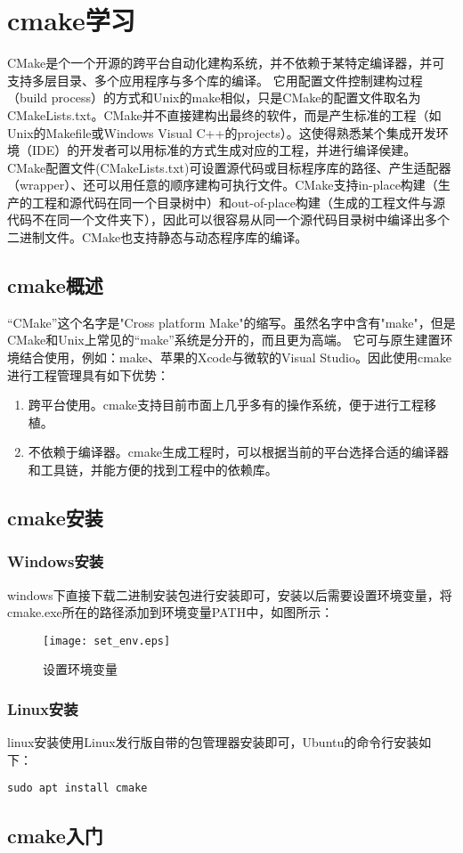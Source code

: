 \documentclass[../main.tex]{subfiles}
\begin{document}
\chapter{cmake学习}
CMake是个一个开源的跨平台自动化建构系统，并不依赖于某特定编译器，并可支持多层目录、多个应用程序与多个库的编译。 它用配置文件控制建构过程（build process）的方式和Unix的make相似，只是CMake的配置文件取名为CMakeLists.txt。CMake并不直接建构出最终的软件，而是产生标准的工程（如Unix的Makefile或Windows Visual C++的projects）。这使得熟悉某个集成开发环境（IDE）的开发者可以用标准的方式生成对应的工程，并进行编译侯建。 CMake配置文件(CMakeLists.txt)可设置源代码或目标程序库的路径、产生适配器（wrapper）、还可以用任意的顺序建构可执行文件。CMake支持in-place构建（生产的工程和源代码在同一个目录树中）和out-of-place构建（生成的工程文件与源代码不在同一个文件夹下），因此可以很容易从同一个源代码目录树中编译出多个二进制文件。CMake也支持静态与动态程序库的编译。
\section{cmake概述}
“CMake”这个名字是"Cross platform Make"的缩写。虽然名字中含有"make"，但是CMake和Unix上常见的“make”系统是分开的，而且更为高端。 它可与原生建置环境结合使用，例如：make、苹果的Xcode与微软的Visual Studio。因此使用cmake进行工程管理具有如下优势：
\begin{enumerate}
    \item 跨平台使用。cmake支持目前市面上几乎多有的操作系统，便于进行工程移植。
    \item 不依赖于编译器。cmake生成工程时，可以根据当前的平台选择合适的编译器和工具链，并能方便的找到工程中的依赖库。
\end{enumerate}
\section{cmake安装}
\subsection{Windows安装}
windows下直接下载二进制安装包进行安装即可，安装以后需要设置环境变量，将cmake.exe所在的路径添加到环境变量PATH中，如图所示：
\begin{figure}[H] %
    \centering
    \texttt{[image: set\_env.eps]}
    \caption{设置环境变量}
    \label{设置环境变量}
\end{figure}
\subsection{Linux安装}
linux安装使用Linux发行版自带的包管理器安装即可，Ubuntu的命令行安装如下：
\begin{lstlisting}[caption={Linux安装Cmake}]
    sudo apt install cmake
\end{lstlisting}
\section{cmake入门}
\end{document}
